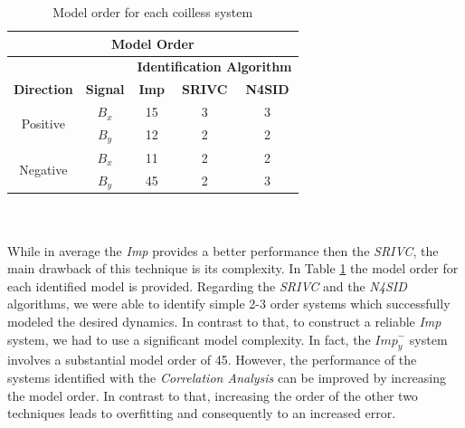 \documentclass[english]{isasthesis}
\begin{document}
	\begin{table}[t!]
	\centering
	\begin{tabular}{|c|c|c|c|c|}
	\hline
	\multicolumn{5}{|c|}{\textbf{Model Order}}                                                           	\\ \hline\hline
	\multicolumn{2}{|c|}{\textbf{}}             & \multicolumn{3}{c|}{\textbf{Identification 			Algorithm}} \\ \hline
	\textbf{Direction}        & \textbf{Signal} &   \textbf{Imp}             & \textbf{SRIVC}             & \textbf{N4SID}            	\\ \hline
	\multirow{2}{*}{Positive} & $B_x$           & 15              & 3                 & 3                	\\ \cline{2-5}
	                          & $B_y$           & 12              & 2                 & 2                	\\ \hline
	\multirow{2}{*}{Negative} & $B_x$           & 11              & 2                 & 2                	\\\cline{2-5}
	                          & $B_y$           & 45              & 2                 & 3                	\\ \hline
	\end{tabular}
	\caption{Model order for each coilless system}
	 \label{table:order}
	\end{table}
	\\\\While in average the \textit{Imp} provides a better performance then the \textit{SRIVC}, the main drawback of this technique is its complexity. In Table \ref{table:order} the model order for each identified model is provided. Regarding the \textit{SRIVC} and the \textit{N4SID} algorithms, we were able to identify simple 2-3 order systems which successfully modeled the desired dynamics. In contrast to that, to construct a reliable \textit{Imp} system, we had to use a significant model complexity. In fact, the $\textit{Imp}^-_y$ system involves a substantial model order of 45. However, the performance of the systems identified with the \textit{Correlation Analysis} can be improved by increasing the model order. In contrast to that, increasing the order of the other two techniques leads to overfitting and consequently to an increased error.
\end{document}
